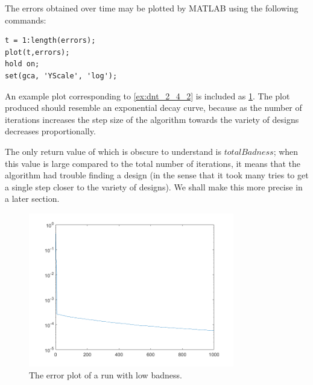 \documentclass{article}
\theoremstyle{definition}
\begin{document}
  The errors obtained over time may be plotted by MATLAB using the following commands:
  \begin{lstlisting}
t = 1:length(errors);
plot(t,errors);
hold on;
set(gca, 'YScale', 'log');
  \end{lstlisting}
  An example plot corresponding to \cref{ex:dnt_2_4_2} is included as \cref{fig:example_error_plot}.
  The plot produced should resemble an exponential decay curve, because as the number of iterations increases
  the step size of the algorithm towards the variety of designs decreases proportionally.

  The only return value of  which is obscure to understand is $ totalBadness $; when
  this value is large compared to the total number of iterations, it means that the algorithm had trouble
  finding a design (in the sense that it took many tries to get a single step closer to the variety of
  designs). We shall make this more precise in a later section.

  \begin{figure}
    \centering
    \includegraphics[width=0.8\textwidth]{example_error_plot}
    \caption{The error plot of a run with low badness.\label{fig:example_error_plot}}
  \end{figure}
\end{document}
